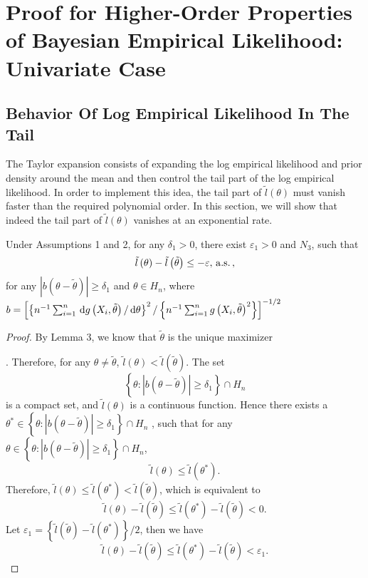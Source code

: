 \chapter{Proof for Higher-Order Properties of Bayesian Empirical Likelihood:
Univariate Case}

\section{Behavior Of Log Empirical Likelihood In  The Tail}

The Taylor expansion consists of  expanding the log empirical
likelihood and prior density around the mean and  then control
the tail part of the log empirical likelihood. In order to implement
this idea, the tail part of $\tilde{l}\left(\theta\right)$ must vanish
faster than the required polynomial order. In this section,
we will show that indeed the tail part of $\tilde{l}\left(\theta\right)$
vanishes at an exponential rate.
\begin{lemma}
\label{lemma:exponential-decay-tail} Under  Assumptions 1 and 2, for any $\delta_{1}>0$, there
exist $\varepsilon_{1}>0$ and $N_{3}$, such that 
\[
\tilde{l}\left(\theta\right)-\tilde{l}\left(\tilde{\theta}\right)\le-\varepsilon,\,\mathrm{a.s.}\,,
\]
for any $\left|b\left(\theta-\tilde{\theta}\right)\right|\ge\delta_{1}$
and $\theta\in H_n$, where $b=\left[\left\{ n^{-1}\sum_{i=1}^{n}\,\mathrm{d} g\left(X_{i},\tilde{\theta}\right)/\,\mathrm{d}\theta\right\} ^{2}/\left\{ n^{-1}\sum_{i=1}^{n}g\left(X_{i},\tilde{\theta}\right)^{2}\right\} \right]^{-1/2}$\end{lemma}
\begin{proof}
By Lemma 3, we know that $\tilde{\theta}$ is the unique maximizer%
\begin{comment}
need to be assume
\end{comment}
. Therefore, for any $\theta\neq\tilde{\theta}$, $\tilde{l}\left(\theta\right)<\tilde{l}\left(\tilde{\theta}\right)$.
The set 
\[
\left\{ \theta:\left|b\left(\theta-\tilde{\theta}\right)\right|\ge\delta_{1}\right\} \cap H_n
\]
is a compact set, and $\tilde{l}\left(\theta\right)$ is a continuous
function. Hence there exists a $\theta^{*}\in\left\{ \theta:\left|b\left(\theta-\tilde{\theta}\right)\right|\ge\delta_{1}\right\} \cap H_n$
, such that for any $\theta\in\left\{ \theta:\left|b\left(\theta-\tilde{\theta}\right)\right|\ge\delta_{1}\right\} \cap H_n$,
\[
\tilde{l}\left(\theta\right)\le\tilde{l}\left(\theta^{*}\right).
\]
Therefore, $\tilde{l}\left(\theta\right)\le\tilde{l}\left(\theta^{*}\right)<\tilde{l}\left(\tilde{\theta}\right)$, which is equivalent to 
\[
\tilde{l}\left(\theta\right)-\tilde{l}\left(\tilde{\theta}\right)\le\tilde{l}\left(\theta^{*}\right)-\tilde{l}\left(\tilde{\theta}\right)<0.
\]
Let $\varepsilon_{1}=\left\{ \tilde{l}\left(\tilde{\theta}\right)-\tilde{l}\left(\theta^{*}\right)\right\} /2$,
then we have 
\[
\tilde{l}\left(\theta\right)-\tilde{l}\left(\tilde{\theta}\right)\le\tilde{l}\left(\theta^{*}\right)-\tilde{l}\left(\tilde{\theta}\right)<\varepsilon_{1}.
\]

\end{proof}

